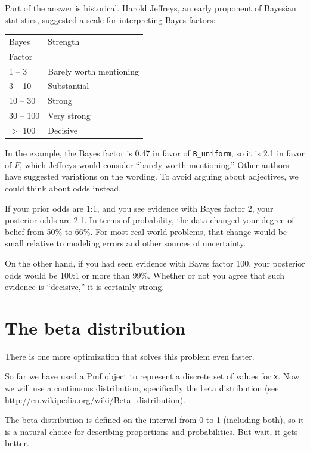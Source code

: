 \documentclass[12pt]{book}
\theoremstyle{exercise}
\begin{document}
Part of the answer is historical.  Harold Jeffreys, an early
proponent of Bayesian statistics, suggested a scale for
interpreting Bayes factors:

\begin{tabular}{|l|l|}
\hline
Bayes & Strength \\
Factor & \\
\hline
1 -- 3 & Barely worth mentioning \\
3 -- 10 & Substantial \\
10 -- 30 & Strong \\
30 -- 100 & Very strong \\
$>$ 100 & Decisive \\
\hline
\end{tabular}

In the example, the Bayes factor is 0.47 in favor of \verb"B_uniform",
so it is 2.1 in favor of $F$, which Jeffreys would consider ``barely
worth mentioning.''  Other authors have suggested variations on the
wording.  To avoid arguing about adjectives, we could think about odds
instead.

If your prior odds are 1:1, and you see evidence with Bayes
factor 2, your posterior odds are 2:1.  In terms of probability,
the data changed your degree of belief from 50\% to 66\%.  For
most real world problems, that change would be small relative
to modeling errors and other sources of uncertainty.

On the other hand, if you had seen evidence with Bayes
factor 100, your posterior odds would be 100:1 or more than 99\%.
Whether or not you agree that such evidence is ``decisive,''
it is certainly strong.

\section{The beta distribution}
\label{beta}

There is one more optimization that solves this problem
even faster.

So far we have used a Pmf object to represent a discrete set of
values for {\tt x}.  Now we will use a continuous
distribution, specifically the beta distribution (see
\url{http://en.wikipedia.org/wiki/Beta_distribution}).

The beta distribution is defined on the interval from 0 to 1
(including both), so it is a natural choice for describing
proportions and probabilities.  But wait, it gets better.
\end{document}
